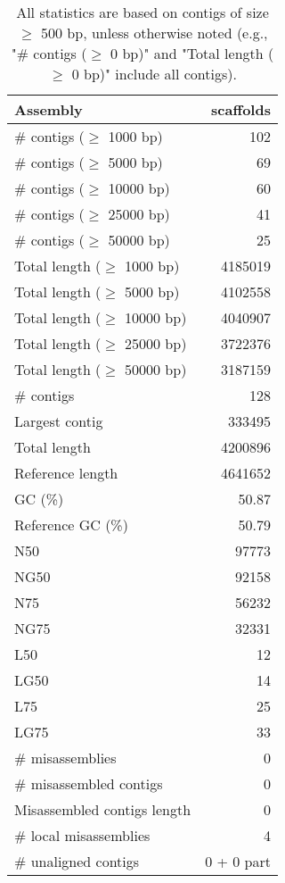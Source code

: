 \documentclass[12pt,a4paper]{article}
\begin{document}
\begin{table}[ht]
\begin{center}
\caption{All statistics are based on contigs of size $\geq$ 500 bp, unless otherwise noted (e.g., "\# contigs ($\geq$ 0 bp)" and "Total length ($\geq$ 0 bp)" include all contigs).}
\begin{tabular}{|l*{1}{|r}|}
\hline
Assembly & scaffolds \\ \hline
\# contigs ($\geq$ 1000 bp) & 102 \\ \hline
\# contigs ($\geq$ 5000 bp) & 69 \\ \hline
\# contigs ($\geq$ 10000 bp) & 60 \\ \hline
\# contigs ($\geq$ 25000 bp) & 41 \\ \hline
\# contigs ($\geq$ 50000 bp) & 25 \\ \hline
Total length ($\geq$ 1000 bp) & 4185019 \\ \hline
Total length ($\geq$ 5000 bp) & 4102558 \\ \hline
Total length ($\geq$ 10000 bp) & 4040907 \\ \hline
Total length ($\geq$ 25000 bp) & 3722376 \\ \hline
Total length ($\geq$ 50000 bp) & 3187159 \\ \hline
\# contigs & 128 \\ \hline
Largest contig & 333495 \\ \hline
Total length & 4200896 \\ \hline
Reference length & 4641652 \\ \hline
GC (\%) & 50.87 \\ \hline
Reference GC (\%) & 50.79 \\ \hline
N50 & 97773 \\ \hline
NG50 & 92158 \\ \hline
N75 & 56232 \\ \hline
NG75 & 32331 \\ \hline
L50 & 12 \\ \hline
LG50 & 14 \\ \hline
L75 & 25 \\ \hline
LG75 & 33 \\ \hline
\# misassemblies & 0 \\ \hline
\# misassembled contigs & 0 \\ \hline
Misassembled contigs length & 0 \\ \hline
\# local misassemblies & 4 \\ \hline
\# unaligned contigs & 0 + 0 part \\ \hline

\end{tabular}
\end{center}
\end{table}
\end{document}
